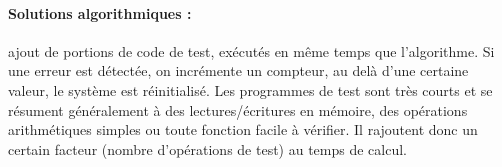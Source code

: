	\paragraph{Solutions algorithmiques :} ajout de portions de code de test, exécutés en même temps que l'algorithme. Si une erreur est détectée, on incrémente un compteur, au delà d’une certaine valeur, le système est réinitialisé. Les programmes de test sont très courts et se résument généralement à des lectures/écritures en mémoire, des opérations arithmétiques simples ou toute fonction facile à vérifier. Il rajoutent donc un certain facteur (nombre d'opérations de test) au temps de calcul. 
			

